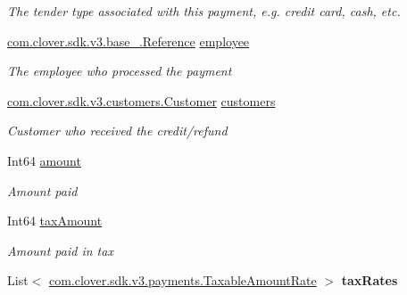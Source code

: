 \begin{DoxyCompactItemize}
\begin{DoxyCompactList}\small\item\em The tender type associated with this payment, e.\+g. credit card, cash, etc. \end{DoxyCompactList}\item 
\hyperlink{classcom_1_1clover_1_1sdk_1_1v3_1_1base___1_1_reference}{com.\+clover.\+sdk.\+v3.\+base\+\_\+.\+Reference} \hyperlink{classcom_1_1clover_1_1sdk_1_1v3_1_1payments_1_1_credit_aafae65ef4b8afa39c532c844c4ad5470}{employee}
\begin{DoxyCompactList}\small\item\em The employee who processed the payment \end{DoxyCompactList}\item 
\hyperlink{classcom_1_1clover_1_1sdk_1_1v3_1_1customers_1_1_customer}{com.\+clover.\+sdk.\+v3.\+customers.\+Customer} \hyperlink{classcom_1_1clover_1_1sdk_1_1v3_1_1payments_1_1_credit_a1d075194acd4bc2987fad6757dd31520}{customers}
\begin{DoxyCompactList}\small\item\em Customer who received the credit/refund \end{DoxyCompactList}\item 
Int64 \hyperlink{classcom_1_1clover_1_1sdk_1_1v3_1_1payments_1_1_credit_ab99189a5b7662b47323aca6862b99c0c}{amount}
\begin{DoxyCompactList}\small\item\em Amount paid \end{DoxyCompactList}\item 
Int64 \hyperlink{classcom_1_1clover_1_1sdk_1_1v3_1_1payments_1_1_credit_a90650469195d49f730284b3e5e0fc3dd}{tax\+Amount}
\begin{DoxyCompactList}\small\item\em Amount paid in tax \end{DoxyCompactList}\item 
\mbox{\label{classcom_1_1clover_1_1sdk_1_1v3_1_1payments_1_1_credit_ab1b45423634a78d0ecc19e7b1c93a608}} 
List$<$ \hyperlink{classcom_1_1clover_1_1sdk_1_1v3_1_1payments_1_1_taxable_amount_rate}{com.\+clover.\+sdk.\+v3.\+payments.\+Taxable\+Amount\+Rate} $>$ {\bfseries tax\+Rates}

\end{DoxyCompactItemize}
